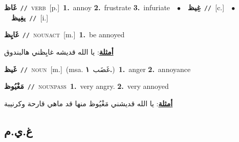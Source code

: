 \documentclass[10pt,a4paper,twoside]{article} %
\begin{document}
\begin{multicols}{2}
{\setlength\topsep{0pt}\textbf{\foreignlanguage{arabic}{غَاظ}}\ {\color{gray}\texttt{//}\color{black}}\ \textsc{verb}\ [p.]\ \textbf{1.}~annoy  \textbf{2.}~frustrate  \textbf{3.}~infuriate\ \ $\bullet$\ \ \setlength\topsep{0pt}\textbf{\foreignlanguage{arabic}{غِيظ}}\ {\color{gray}\texttt{//}\color{black}}\ [c.]\ \ $\bullet$\ \ \setlength\topsep{0pt}\textbf{\foreignlanguage{arabic}{يغِيظ}}\ {\color{gray}\texttt{//}\color{black}}\ [i.]\ } \vspace{2mm}

{\setlength\topsep{0pt}\textbf{\foreignlanguage{arabic}{غَايِظ}}\ {\color{gray}\texttt{//}\color{black}}\ \textsc{noun\textunderscore act}\ [m.]\ \textbf{1.}~be annoyed\  \begin{flushright}\color{gray}\foreignlanguage{arabic}{\textbf{\underline{\foreignlanguage{arabic}{أمثلة}}}: يا الله قديشه غايِظني هالبندوق}\end{flushright}\color{black}} \vspace{2mm}

{\setlength\topsep{0pt}\textbf{\foreignlanguage{arabic}{غَيظ}}\ {\color{gray}\texttt{//}\color{black}}\ \textsc{noun}\ [m.]\ \color{gray}(msa. \foreignlanguage{arabic}{غَضَب}~\foreignlanguage{arabic}{\textbf{١.}})\color{black}\ \textbf{1.}~anger  \textbf{2.}~annoyance\ } \vspace{2mm}

{\setlength\topsep{0pt}\textbf{\foreignlanguage{arabic}{مَغْيُوظ}}\ {\color{gray}\texttt{//}\color{black}}\ \textsc{noun\textunderscore pass}\ \textbf{1.}~very angry.  \textbf{2.}~very annoyed\  \begin{flushright}\color{gray}\foreignlanguage{arabic}{\textbf{\underline{\foreignlanguage{arabic}{أمثلة}}}: يا الله قديشني مَغْيُوظ منها قد ماهي قارحة وكرنيبة}\end{flushright}\color{black}} \vspace{2mm}

\vspace{-3mm}
\subsection*{\color{blue}\foreignlanguage{arabic}{غ.ي.م}\color{blue}{}} 


\end{multicols}
\end{document}

